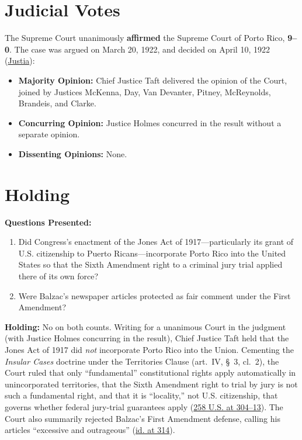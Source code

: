 \documentclass[12pt]{article}
\begin{document}
\section{Judicial Votes}
The Supreme Court unanimously \textbf{affirmed} the Supreme Court of Porto Rico, \textbf{9--0}. The case was argued on March 20, 1922, and decided on April 10, 1922 (\href{https://supreme.justia.com/cases/federal/us/258/298/}{Justia}):

\begin{itemize}
    \item \textbf{Majority Opinion:} Chief Justice Taft delivered the opinion of the Court, joined by Justices McKenna, Day, Van Devanter, Pitney, McReynolds, Brandeis, and Clarke.
    \item \textbf{Concurring Opinion:} Justice Holmes concurred in the result without a separate opinion.
    \item \textbf{Dissenting Opinions:} None.
\end{itemize}

\section{Holding}
\textbf{Questions Presented:}

\begin{enumerate}
  \item Did Congress's enactment of the Jones Act of 1917---particularly its grant of U.S. citizenship to Puerto Ricans---incorporate Porto Rico into the United States so that the Sixth Amendment right to a criminal jury trial applied there of its own force?
  \item Were Balzac's newspaper articles protected as fair comment under the First Amendment?
\end{enumerate}

\textbf{Holding:} No on both counts. Writing for a unanimous Court in the judgment (with Justice Holmes concurring in the result), Chief Justice Taft held that the Jones Act of 1917 did \textit{not} incorporate Porto Rico into the Union. Cementing the \textit{Insular Cases} doctrine under the Territories Clause (art.~IV, \S~3, cl.~2), the Court ruled that only ``fundamental'' constitutional rights apply automatically in unincorporated territories, that the Sixth Amendment right to trial by jury is not such a fundamental right, and that it is ``locality,'' not U.S. citizenship, that governs whether federal jury-trial guarantees apply (\href{https://supreme.justia.com/cases/federal/us/258/298/}{258 U.S. at 304--13}). The Court also summarily rejected Balzac's First Amendment defense, calling his articles ``excessive and outrageous'' (\href{https://supreme.justia.com/cases/federal/us/258/298/}{id. at 314}).
\end{document}
